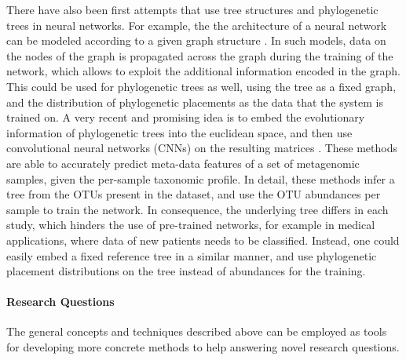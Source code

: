 There have also been first attempts that use tree structures and phylogenetic trees in neural networks.
For example, the the architecture of a neural network can be modeled
according to a given graph structure \cite{Scarselli2009,Bronstein2017}.
In such models, data on the nodes of the graph is propagated across the graph during the training of the network,
which allows to exploit the additional information encoded in the graph.
This could be used for phylogenetic trees as well, using the tree as a fixed graph,
and the distribution of phylogenetic placements as the data that the system is trained on.
A very recent and promising idea is to embed the evolutionary information of phylogenetic trees into the euclidean space,
and then use convolutional neural networks (CNNs) on the resulting matrices \cite{Fioravanti2018,Reiman2017,Reiman2018}.
These methods are able to accurately predict meta-data features of a set of metagenomic samples,
given the per-sample taxonomic profile.
In detail, these methods infer a tree from the OTUs present in the dataset,
and use the OTU abundances per sample to train the network.
In consequence, the underlying tree differs in each study, which hinders the use of pre-trained networks,
for example in medical applications, where data of new patients needs to be classified.
Instead, one could easily embed a fixed reference tree in a similar manner,
and use phylogenetic placement distributions on the tree instead of abundances for the training.

\paragraph{Research Questions}
\label{ch:ConclusionOutlook:par:ResearchQuestions}


The general concepts and techniques described above %
can be employed as tools for developing more concrete methods to help answering novel research questions.


